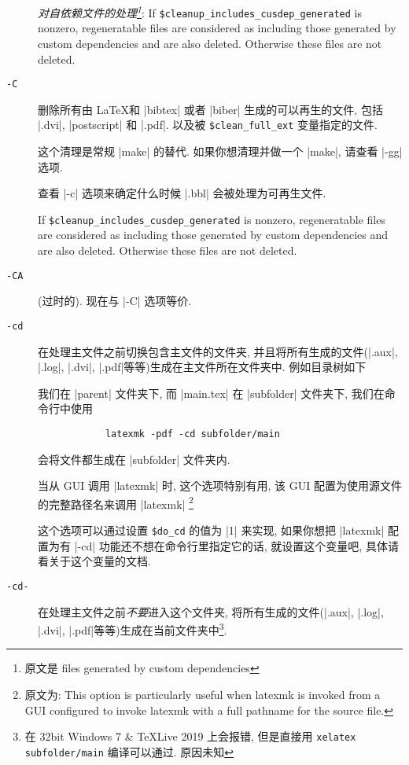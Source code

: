 \documentclass{ctexart}
\begin{document}
\begin{description}
		\emph{对自依赖文件的处理\footnote{原文是 files generated by custom dependencies}}: If \verb|$cleanup_includes_cusdep_generated| is nonzero, regeneratable files are considered as including those generated by custom dependencies and are also deleted. Otherwise these files are not deleted.
		
		\item[\texttt{-C}] 删除所有由 \LaTeX 和 |bibtex| 或者 |biber| 生成的可以再生的文件, 包括 |.dvi|, |postscript| 和 |.pdf|. 以及被 \verb|$clean_full_ext| 变量指定的文件. 
		
		这个清理是常规 |make| 的替代. 如果你想清理并做一个 |make|, 请查看 |-gg| 选项.

		查看 |-c| 选项来确定什么时候 |.bbl| 会被处理为可再生文件. 

		If \verb|$cleanup_includes_cusdep_generated| is nonzero, regeneratable files are considered as including those generated by custom dependencies and are also deleted. Otherwise these files are not deleted.

		\item[\texttt{-CA}] (过时的). 现在与 |-C| 选项等价. 
		\item[\texttt{-cd}] 在处理主文件之前切换包含主文件的文件夹, 并且将所有生成的文件(|.aux|, |.log|, |.dvi|, |.pdf|等等)生成在主文件所在文件夹中. 例如目录树如下
		
		\begin{center}
		\begin{minipage}{.8\textwidth}
		\end{minipage}             
		\end{center}

		我们在 |parent| 文件夹下, 而 |main.tex| 在 |subfolder| 文件夹下, 我们在命令行中使用

		\begin{Verbatim}
			latexmk -pdf -cd subfolder/main
		\end{Verbatim}

		会将文件都生成在 |subfolder| 文件夹内. 

		当从 GUI 调用 |latexmk| 时, 这个选项特别有用, 该 GUI 配置为使用源文件的完整路径名来调用 |latexmk| \footnote{原文为: This option is particularly useful when latexmk is invoked from a GUI configured to invoke latexmk with a full pathname for the source file.}

		这个选项可以通过设置 \verb|$do_cd| 的值为 |1| 来实现, 如果你想把 |latexmk| 配置为有 |-cd| 功能还不想在命令行里指定它的话, 就设置这个变量吧, 具体请看关于这个变量的文档.

		\item[\texttt{-cd-}] 在处理主文件之前\emph{不要}进入这个文件夹, 将所有生成的文件(|.aux|, |.log|, |.dvi|, |.pdf|等等)生成在当前文件夹中\footnote{在 32bit Windows 7 \& \TeX{}Live 2019 上会报错, 但是直接用 \texttt{xelatex subfolder/main} 编译可以通过. 原因未知}.
	\end{description}
\end{document}
